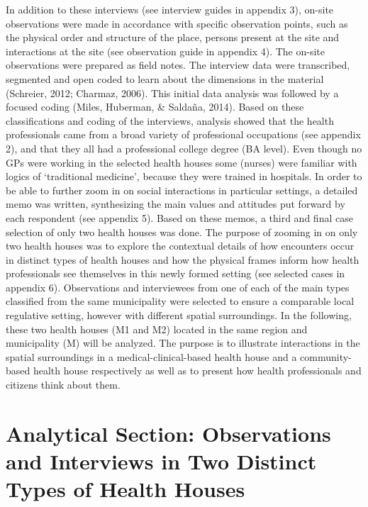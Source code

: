 \par
In addition to these interviews (see interview guides in appendix 3), on-site observations were made in accordance with specific observation points, such as the physical order and structure of the place, persons present at the site and interactions at the site (see observation guide in appendix 4). The on-site observations were prepared as field notes. The interview data were transcribed, segmented and open coded to learn about the dimensions in the material (Schreier, 2012; Charmaz, 2006). This initial data analysis was followed by a focused coding (Miles, Huberman, \& Saldaña, 2014). Based on these classifications and coding of the interviews, analysis showed that the health professionals came from a broad variety of professional occupations (see appendix 2), and that they all had a professional college degree (BA level). Even though no GPs were working in the selected health houses some (nurses) were familiar with logics of ‘traditional medicine’, because they were trained in hospitals. In order to be able to further zoom in on social interactions in particular settings, a detailed memo was written, synthesizing the main values and attitudes put forward by each respondent (see appendix 5). Based on these memos, a third and final case selection of only two health houses was done. The purpose of zooming in on only two health houses was to explore the contextual details of how encounters occur in distinct types of health houses and how the physical frames inform how health professionals see themselves in this newly formed setting (see selected cases in appendix 6). Observations and interviewees from one of each of the main types classified from the same municipality were selected to ensure a comparable local regulative setting, however with different spatial surroundings. In the following, these two health houses (M1 and M2) located in the same region and municipality (M) will be analyzed. The purpose is to illustrate interactions in the spatial surroundings in a medical-clinical-based health house and a community-based health house respectively as well as to present how health professionals and citizens think about them.

\chapter{Analytical Section: Observations and Interviews in Two Distinct Types of Health Houses}
